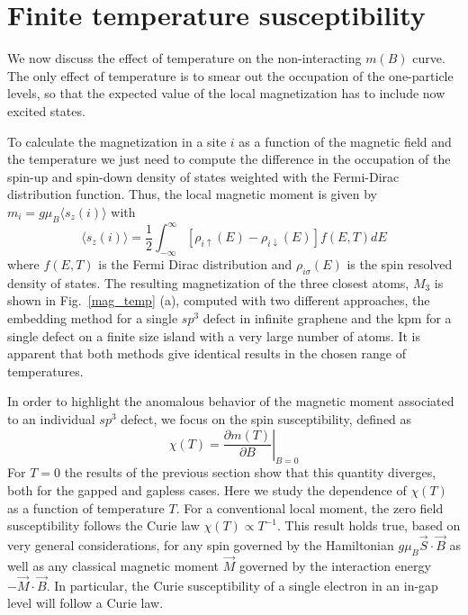 \section{Finite temperature susceptibility}
\label{sec:Temp}
We now discuss the effect of temperature on the non-interacting $m(B)$ curve. The only effect of temperature is to smear out the occupation of the one-particle levels, so that the expected value of the local magnetization has to include now excited states.

To calculate the magnetization in a site $i$  as a function of the magnetic field and the temperature we just need to compute the difference in the occupation of the spin-up and spin-down density of states weighted with the Fermi-Dirac distribution function. Thus, the local magnetic moment is given by $m_i = g\mu_B \langle s_z(i) \rangle$ with
\begin{equation}
       \langle s_z(i) \rangle = \frac{1}{2}
      \int^{\infty}_{-\infty}\left[
      \rho_{i\uparrow}(E)-\rho_{i \downarrow}(E)
      \right] f(E,T) dE
\label{mag_b_t}
\end{equation}
where $f(E,T)$ is the Fermi Dirac distribution and $\rho_{i\sigma}(E)$ is the spin resolved density of states. The resulting magnetization of the three closest atoms, $M_3$ is shown in Fig.~\ref{mag_temp} (a), computed with two different approaches, the embedding method for a single $sp^3$ defect in infinite graphene and the \ac{kpm} for a single defect on a finite size island with a very large number of atoms.
It is apparent that both methods give identical results in the chosen range of temperatures.

In order to highlight the anomalous behavior of the magnetic  moment associated to an individual $sp^3$ defect, we focus on the spin susceptibility, defined as
\begin{equation}
  \chi(T) = \left.\frac{\partial m (T)}{\partial B}\right|_{B=0}
\label{susceptibility}
\end{equation}
For $T=0$ the results of the previous section show that this quantity diverges, both for the gapped and gapless cases. Here we study the dependence of $\chi(T)$ as a function of temperature $T$. For a conventional local moment,  the zero field susceptibility follows the Curie law $\chi(T) \propto T^{-1}$. This result holds true, based on very general considerations, for any spin governed by the Hamiltonian $g\mu_B  \vec{S}\cdot\vec{B}$ as well as any classical magnetic moment $\vec{M}$ governed by the interaction energy $-\vec{M}\cdot\vec{B}$. In particular, the Curie susceptibility of a single electron in an in-gap level will follow a Curie law.

